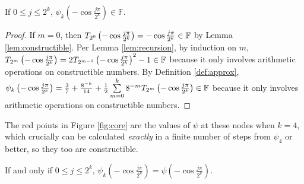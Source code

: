 \begin{lemma}
  \label{lem:psi_k_constructible}
  \leanok
  If $0 \leq j \leq 2^k$, $\psi_{k}\left(-\cos\frac{j\pi}{2^k}\right) \in \mathbb{F}$.
\end{lemma}
\begin{proof}
   \leanok
   If $m = 0$, then $T_{2^{0}}\left(-\cos\frac{j\pi}{2^k}\right) = -\cos\frac{j\pi}{2^k} \in \mathbb{F}$ by Lemma \ref{lem:constructible}. Per Lemma \ref{lem:recursion}, by induction on $m$, $T_{2^{m}}\left(-\cos\frac{j\pi}{2^k}\right) = 2 T_{2^{m - 1}}\left(-\cos\frac{j\pi}{2^k}\right)^2 - 1 \in \mathbb{F}$ because it only involves arithmetic operations on constructible numbers. By Definition \ref{def:approx}, $\psi_k\left(-\cos\frac{j\pi}{2^k}\right) = \frac{3}{7} + \frac{8^{-k}}{14} + \frac{1}{2} \sum\limits_{m = 0}^{k} 8^{-m} T_{2^{m}}\left(-\cos\frac{j\pi}{2^k}\right) \in \mathbb{F}$ because it only involves arithmetic operations on constructible numbers.
\end{proof}


The red points in Figure \ref{fig:core} are the values of $\psi$ at these nodes when $k = 4$, which crucially can be calculated \emph{exactly} in a finite number of steps from $\psi_4$ or better, so they too are constructible.

\begin{lemma}
  \label{lem:magic}
  \leanok
  If and only if $0 \leq j \leq 2^k$, $\psi_k\left(-\cos\frac{j\pi}{2^k}\right) = \psi\left(-\cos\frac{j\pi}{2^k}\right)$.
\end{lemma}

